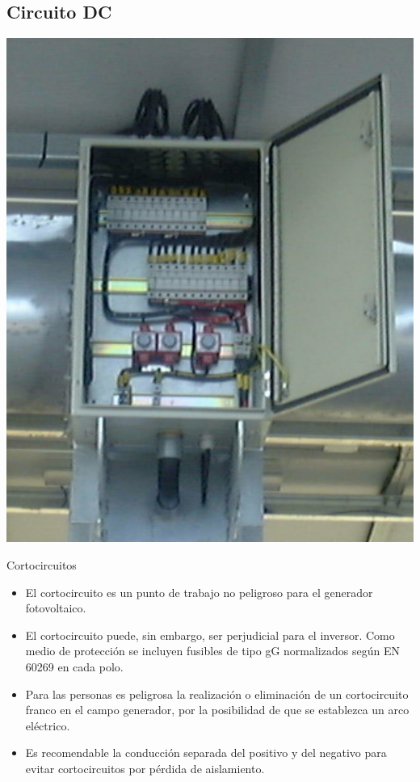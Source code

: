 \documentclass[xcolor={usenames,svgnames,dvipsnames}]{beamer}
\begin{document}
\subsection{Circuito DC}
\label{sec:org17ee774}
\begin{frame}[label={sec:orgdbd91d8}]{}
\begin{center}
\includegraphics[height=0.8\textheight]{../figs/CajaProteccionesPhotocampa.pdf}
\end{center}
\end{frame}


\begin{frame}[label={sec:org0d54390}]{Cortocircuitos}
\begin{itemize}
\item El \alert{cortocircuito} es un punto de trabajo \alert{no peligroso para el
generador fotovoltaico}.

\item El cortocircuito puede, sin embargo, ser \alert{perjudicial para el
inversor}. Como medio de protección se incluyen fusibles de tipo gG
normalizados según EN 60269 en cada polo.

\item Para las personas es \alert{peligrosa la realización o eliminación de un
cortocircuito franco en el campo generador}, por la posibilidad de
que se establezca un arco eléctrico.

\item Es recomendable la \alert{conducción separada} del positivo y del negativo
para evitar cortocircuitos por pérdida de aislamiento.
\end{itemize}
\end{frame}
\end{document}
